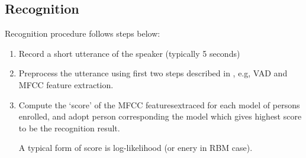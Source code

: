\subsection{Recognition}
	Recognition procedure follows steps below:
	\begin{enumerate}
		\item Record a short utterance of the speaker (typically 5 seconds)
		\item Preprocess the utterance using first two steps described in
			, e.g, VAD and MFCC feature extraction.
		\item Compute the `score' of the MFCC featuresextraced for each model of persons
			enrolled, and adopt person corresponding the model which gives highest score to be the
			recognition result.

			A typical form of score is log-likelihood (or enery in RBM case).

	\end{enumerate}

